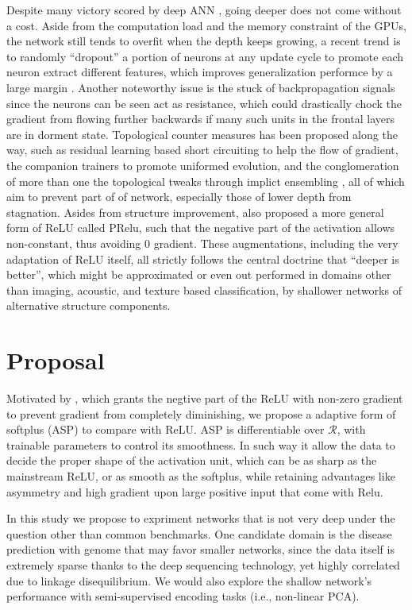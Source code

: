 \documentclass[acmtog, authorversion]{acmart}
\begin{document}
Despite many victory scored by deep ANN \cite{DL:Intro2, DL:Intro3}, going deeper does not come without a cost. Aside from the computation load and the memory constraint of the GPUs, the network still tends to overfit when the depth keeps growing, a recent trend is to randomly ``dropout'' a portion of neurons at any update cycle to promote each neuron extract different features, which improves generalization performce by a large margin \cite{DL:DRP1}. Another noteworthy issue is the stuck of backpropagation signals since the neurons can be seen act as resistance, which could drastically chock the gradient from flowing further backwards if many such units in the frontal layers are in dorment state. Topological counter measures has been proposed along the way, such as residual learning based short circuiting \cite{DL:DRL1} to help the flow of gradient, the companion trainers \cite{DL:DSN1} to promote uniformed evolution, and the conglomeration of more than one the topological tweaks through implict ensembling \cite{DL:SWP1}, all of which aim to prevent part of of network, especially those of lower depth from stagnation. Asides from structure improvement, \cite{DL:Relu2} also proposed a more general form of ReLU called PRelu, such that the negative part of the activation allows non-constant, thus avoiding 0 gradient. These augmentations, including the very adaptation of ReLU itself, all strictly follows the central doctrine that ``deeper is better'', which might be approximated or even out performed in domains other than imaging, acoustic, and texture based classification, by shallower networks of alternative structure components.

\section{Proposal}
Motivated by \cite{DL:Relu2}, which grants the negtive part of the ReLU with non-zero gradient to prevent gradient from completely diminishing, we propose a adaptive form of softplus (ASP) to compare with ReLU. ASP is differentiable over $\mathcal{R}$, with trainable parameters to control its smoothness. In such way it allow the data to decide the proper shape of the activation unit, which can be as sharp as the mainstream ReLU, or as smooth as the softplus, while retaining advantages like asymmetry and high gradient upon large positive input that come with Relu.

In this study we propose to expriment networks that is not very deep under the question other than common benchmarks. One candidate domain is the disease prediction with genome that may favor smaller networks, since the data itself is extremely sparse thanks to the deep sequencing technology, yet highly correlated due to linkage disequilibrium. We would also explore the shallow network's performance with semi-supervised encoding tasks (i.e., non-linear PCA).
\end{document}
